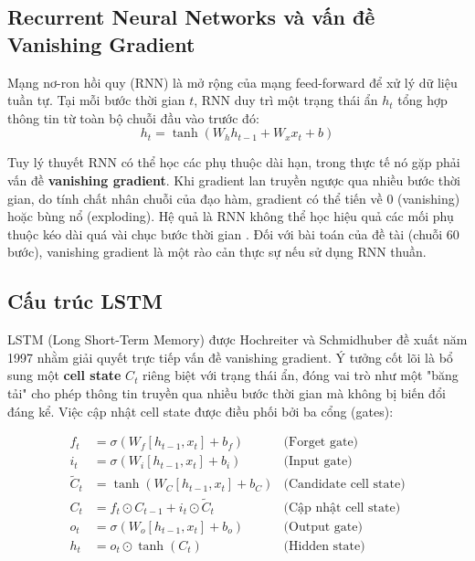 \subsection{Recurrent Neural Networks và vấn đề Vanishing Gradient}

Mạng nơ-ron hồi quy (RNN) là mở rộng của mạng feed-forward để xử lý dữ liệu tuần tự. Tại mỗi bước thời gian $t$, RNN duy trì một trạng thái ẩn $h_t$ tổng hợp thông tin từ toàn bộ chuỗi đầu vào trước đó:
\begin{equation}
  h_t = \tanh(W_h h_{t-1} + W_x x_t + b)
\end{equation}

Tuy lý thuyết RNN có thể học các phụ thuộc dài hạn, trong thực tế nó gặp phải vấn đề \textbf{vanishing gradient}. Khi gradient lan truyền ngược qua nhiều bước thời gian, do tính chất nhân chuỗi của đạo hàm, gradient có thể tiến về 0 (vanishing) hoặc bùng nổ (exploding). Hệ quả là RNN không thể học hiệu quả các mối phụ thuộc kéo dài quá vài chục bước thời gian \cite{gambiroza2020}. Đối với bài toán của đề tài (chuỗi 60 bước), vanishing gradient là một rào cản thực sự nếu sử dụng RNN thuần.

\subsection{Cấu trúc LSTM}

LSTM (Long Short-Term Memory) được Hochreiter và Schmidhuber đề xuất năm 1997 \cite{hochreiter1997} nhằm giải quyết trực tiếp vấn đề vanishing gradient. Ý tưởng cốt lõi là bổ sung một \textbf{cell state} $C_t$ riêng biệt với trạng thái ẩn, đóng vai trò như một "băng tải" cho phép thông tin truyền qua nhiều bước thời gian mà không bị biến đổi đáng kể. Việc cập nhật cell state được điều phối bởi ba cổng (gates):

\begin{align}
  f_t &= \sigma(W_f [h_{t-1}, x_t] + b_f) & \text{(Forget gate)} \\
  i_t &= \sigma(W_i [h_{t-1}, x_t] + b_i) & \text{(Input gate)} \\
  \tilde{C}_t &= \tanh(W_C [h_{t-1}, x_t] + b_C) & \text{(Candidate cell state)} \\
  C_t &= f_t \odot C_{t-1} + i_t \odot \tilde{C}_t & \text{(Cập nhật cell state)} \\
  o_t &= \sigma(W_o [h_{t-1}, x_t] + b_o) & \text{(Output gate)} \\
  h_t &= o_t \odot \tanh(C_t) & \text{(Hidden state)}
\end{align}

